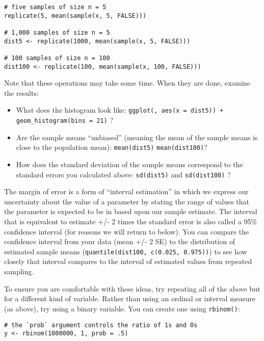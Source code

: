 \documentclass[a4paper,12pt]{article}
\begin{document}
\begin{enumerate*}
\begin{verbatim}
# five samples of size n = 5
replicate(5, mean(sample(x, 5, FALSE)))

# 1,000 samples of size n = 5
dist5 <- replicate(1000, mean(sample(x, 5, FALSE)))

# 100 samples of size n = 100
dist100 <- replicate(100, mean(sample(x, 100, FALSE)))
\end{verbatim}

\noindent Note that these operations may take some time. When they are done, examine the results:

\begin{itemize}
\item What does the histogram look like: \texttt{ggplot(, aes(x = dist5)) + geom\_histogram(bins = 21)} ?
\item Are the sample means ``unbiased'' (meaning the mean of the sample means is close to the population mean): \texttt{mean(dist5)} \texttt{mean(dist100)}?
\item How does the standard deviation of the sample means correspond to the standard errors you calculated above: \texttt{sd(dist5)} and \texttt{sd(dist100)} ?
\end{itemize}

\item The margin of error is a form of ``interval estimation'' in which we express our uncertainty about the value of a parameter by stating the range of values that the parameter is expected to be in based upon our sample estimate. The interval that is equivalent to estimate +/- 2 times the standard error is also called a 95\% confidence interval (for reasons we will return to below). You can compare the confidence interval from your data (mean +/- 2 SE) to the distribution of estimated sample means (\texttt{quantile(dist100, c(0.025, 0.975))}) to see how closely that interval compares to the interval of estimated values from repeated sampling.

\item To ensure you are comfortable with these ideas, try repeating all of the above but for a different kind of variable. Rather than using an ordinal or interval measure (as above), try using a binary variable. You can create one using \texttt{rbinom()}:

\begin{verbatim}
# the `prob` argument controls the ratio of 1s and 0s
y <- rbinom(1000000, 1, prob = .5) 
\end{verbatim}


\end{enumerate*}
\end{document}
